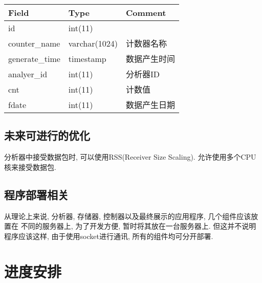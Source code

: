 {\begin{mdframed}[everyline=true]
\begin{center}
    \label{tbl_counter}
    \begin{tabular}{lll} \hline
    Field          & Type          & Comment \\ \hline
    id             & int(11)       &         \\
    counter\_name  & varchar(1024) & 计数器名称   \\
    generate\_time & timestamp     & 数据产生时间  \\
    analyer\_id    & int(11)       & 分析器ID   \\
    cnt            & int(11)       & 计数值     \\
    fdate          & int(11)       & 数据产生日期  \\ \hline
    \end{tabular}
\end{center}



\subsection{未来可进行的优化}

分析器中接受数据包时, 可以使用RSS(Receiver Size Scaling).
允许使用多个CPU 核来接受数据包.

\subsection{程序部署相关}

从理论上来说, 分析器, 存储器, 控制器以及最终展示的应用程序,
几个组件应该放置在 不同的服务器上, 为了开发方便,
暂时将其放在一台服务器上. 但这并不说明程序应该这样,
由于使用socket进行通讯, 所有的组件均可分开部署.




\section{进度安排}


\end{mdframed}}
